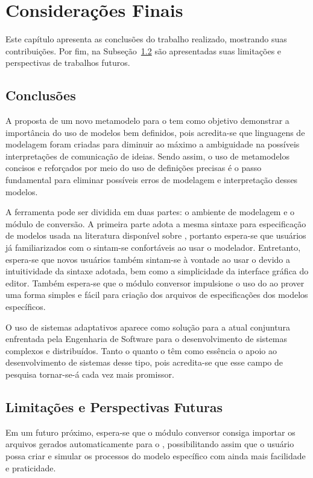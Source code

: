 \chapter{Considerações Finais}
\label{sec-conclusoes}

Este capítulo apresenta as conclusões do trabalho realizado, mostrando suas contribuições. Por fim, na Subseção~\ref{sec-consideracoes-finais-limitacoes-perspectivas} são apresentadas suas limitações e perspectivas de trabalhos futuros.

\section{Conclusões}
\label{sec-consideracoes-finais-conclusoes}

A proposta de um novo metamodelo para o \zanshin tem como objetivo demonstrar a importância do uso de modelos bem definidos, pois acredita-se que linguagens de modelagem foram criadas para diminuir ao máximo a ambiguidade na possíveis interpretações de comunicação de ideias. Sendo assim, o uso de metamodelos concisos e reforçados por meio do uso de definições precisas é o passo fundamental para eliminar possíveis erros de modelagem e interpretação desses modelos.

A ferramenta \unagi pode ser dividida em duas partes: o ambiente de modelagem e o módulo de conversão. A primeira parte adota a mesma sintaxe para especificação de modelos usada na literatura disponível sobre \zanshin, portanto espera-se que usuários já familiarizados com o \framework sintam-se confortáveis ao usar o modelador. Entretanto, espera-se que novos usuários também sintam-se à vontade ao usar o \unagi devido a intuitividade da sintaxe adotada, bem como a simplicidade da interface gráfica do editor. Também espera-se que o módulo conversor impulsione o uso do \zanshin ao prover uma forma simples e fácil para criação dos arquivos de especificações dos modelos específicos. 

O uso de sistemas adaptativos aparece como solução para a atual conjuntura enfrentada pela Engenharia de Software para o desenvolvimento de sistemas complexos e distribuídos. Tanto o \zanshin quanto o \unagi têm como essência o apoio ao desenvolvimento de sistemas desse tipo, pois acredita-se que esse campo de pesquisa tornar-se-á cada vez mais promissor.


\section{Limitações e Perspectivas Futuras}
\label{sec-consideracoes-finais-limitacoes-perspectivas}
Em um futuro próximo, espera-se que o módulo conversor consiga importar os arquivos gerados automaticamente para o \zanshin, possibilitando assim que o usuário possa criar e simular os processos do modelo específico com ainda mais facilidade e praticidade. 